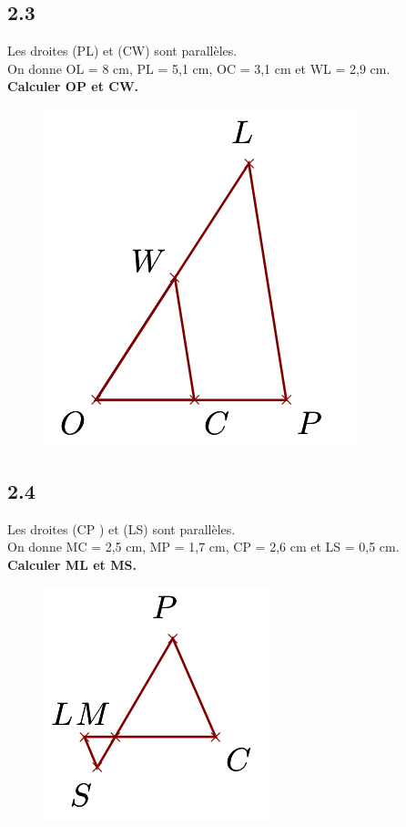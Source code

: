 \documentclass[12pt]{article}
\begin{document}
\begin{multicols}{2}
  \subsection*{2.3}
  \begin{multicols}{2}
    Les droites (PL) et (CW) sont parallèles.\\
    On donne OL = 8 cm, PL = 5,1 cm, OC = 3,1 cm et WL = 2,9 cm.\\
    \textbf{Calculer OP et CW.}
    \begin{figure}[H]
      \centering
      \includegraphics[width=.5\linewidth]{4x6-thales/sources/th3.png}
    \end{figure}
  \end{multicols}


  \subsection*{2.4}
  \begin{multicols}{2}
    Les droites (CP ) et (LS) sont parallèles.\\
    On donne MC = 2,5 cm, MP = 1,7 cm, CP = 2,6 cm et LS = 0,5 cm.\\
    \textbf{Calculer ML et MS.}
    \begin{figure}[H]
      \centering
      \includegraphics[width=.5\linewidth]{4x6-thales/sources/th4.png}
    \end{figure}
  \end{multicols}
\end{multicols}
\end{document}
